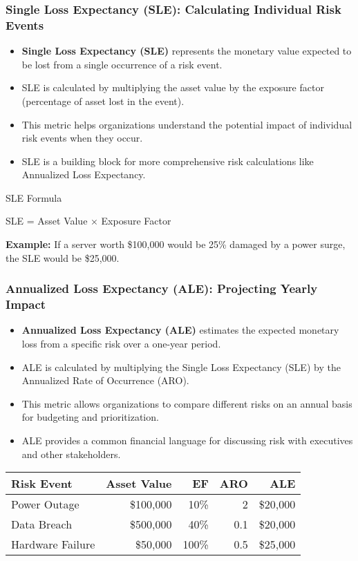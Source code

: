 \documentclass{beamer}
\begin{document}
    \begin{frame}
    \frametitle{Single Loss Expectancy (SLE): Calculating Individual Risk Events}
    \begin{itemize}
      \item \textbf{Single Loss Expectancy (SLE)} represents the monetary value expected to be lost from a single occurrence of a risk event.
      \item SLE is calculated by multiplying the asset value by the exposure factor (percentage of asset lost in the event).
      \item This metric helps organizations understand the potential impact of individual risk events when they occur.
      \item SLE is a building block for more comprehensive risk calculations like Annualized Loss Expectancy.
    \end{itemize}
    
    \begin{block}{SLE Formula}
    \begin{center}
    SLE = Asset Value × Exposure Factor
    \end{center}
    \textbf{Example:} If a server worth \$100,000 would be 25\% damaged by a power surge, the SLE would be \$25,000.
    \end{block}
    \end{frame}
    
    \begin{frame}
    \frametitle{Annualized Loss Expectancy (ALE): Projecting Yearly Impact}
    \begin{itemize}
      \item \textbf{Annualized Loss Expectancy (ALE)} estimates the expected monetary loss from a specific risk over a one-year period.
      \item ALE is calculated by multiplying the Single Loss Expectancy (SLE) by the Annualized Rate of Occurrence (ARO).
      \item This metric allows organizations to compare different risks on an annual basis for budgeting and prioritization.
      \item ALE provides a common financial language for discussing risk with executives and other stakeholders.
    \end{itemize}
    
    \begin{table}
    \centering
    \begin{tabular}{lrrrr}
    \toprule
    \textbf{Risk Event} & \textbf{Asset Value} & \textbf{EF} & \textbf{ARO} & \textbf{ALE} \\
    \midrule
    Power Outage & \$100,000 & 10\% & 2 & \$20,000 \\
    Data Breach & \$500,000 & 40\% & 0.1 & \$20,000 \\
    Hardware Failure & \$50,000 & 100\% & 0.5 & \$25,000 \\
    \bottomrule
    \end{tabular}
    \end{table}
    \end{frame}
    
\end{document}
